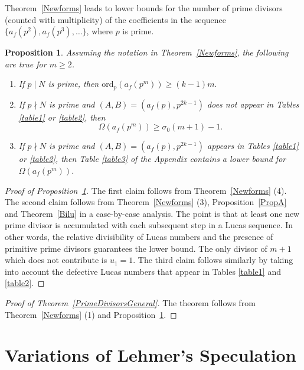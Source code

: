 \documentclass[12pt]{amsart}
\newtheorem{prop}[thm]{Proposition}
\newcommand{\ord}{\mathrm{ord}}
\newcommand{\?}{\color{red}?}
\numberwithin{equation}{section}
\begin{document}
Theorem~\ref{Newforms} leads to lower bounds for
 the number of prime divisors (counted with multiplicity) of the coefficients in the sequence $\{a_f(p^2),a_f(p^3),\dots\}$, where $p$ is prime.

\begin{prop}\label{PrimePower} Assuming the notation in Theorem~\ref{Newforms},  the following are true for $m\geq 2$.
\begin{enumerate}
\item If $p\mid N$ is prime, then $\ord_p(a_f(p^m))\geq (k-1)m.$
\item If $p\nmid N$ is prime and $(A,B)=(a_f(p),p^{2k-1})$ does not appear in Tables \ref{table1} or \ref{table2}, then
$$
\Omega(a_f(p^m))\geq \sigma_0(m+1)-1.
$$
\item If $p\nmid N$ is prime and $(A,B)=(a_f(p),p^{2k-1})$ appears in Tables \ref{table1} or \ref{table2}, then Table \ref{table3} of the Appendix contains a lower bound
for $\Omega(a_f(p^m))$.
\end{enumerate}
\end{prop}


\begin{proof}[Proof of Proposition~\ref{PrimePower}]
The first claim follows from Theorem~\ref{Newforms} (4). The second claim follows from Theorem~\ref{Newforms} (3), 
Proposition~\ref{PropA} 
and Theorem~\ref{Bilu} in a case-by-case analysis. The point is that at least one new prime divisor is accumulated with each subsequent step in a Lucas sequence. In other words,  the relative divisibility of Lucas numbers and the presence of primitive prime divisors guarantees the lower bound. The only divisor of $m+1$ which does not contribute is $u_1=1$.
The third claim follows similarly by taking into account the  defective Lucas numbers
that appear in Tables \ref{table1} and \ref{table2}.
\end{proof}

\begin{proof}[Proof of Theorem~\ref{PrimeDivisorsGeneral}]
The theorem follows from Theorem~\ref{Newforms} (1)  and Proposition~\ref{PrimePower}.
\end{proof}

\section{Variations of Lehmer's Speculation}\label{SectionLehmer}
\end{document}
